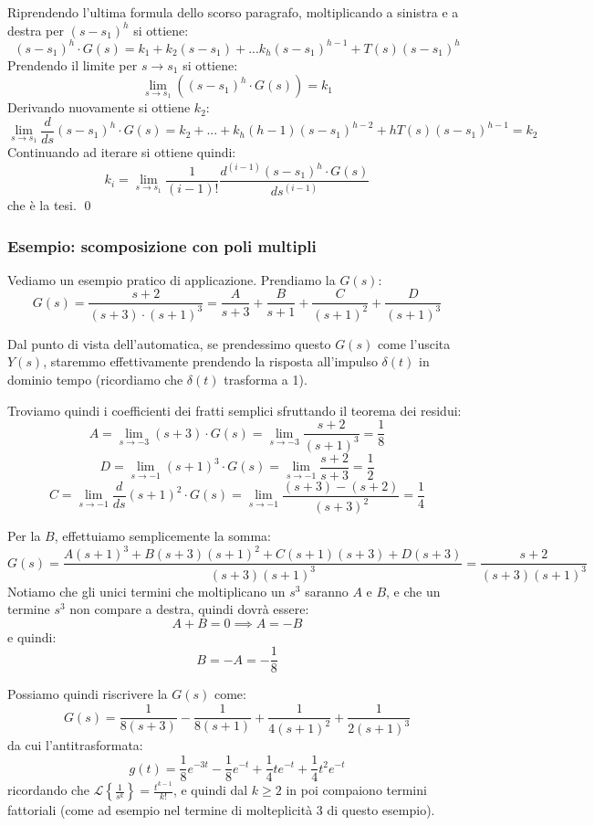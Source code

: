 \documentclass[a4paper,11pt]{article}
\begin{document}
Riprendendo l'ultima formula dello scorso paragrafo, moltiplicando a sinistra e a destra per $(s - s_1)^h$ si ottiene:
$$
(s - s_1)^h \cdot G(s) = k_1 + k_2 (s - s_1) + ... k_h (s - s_1)^{h - 1} + T(s) (s - s_1)^h 
$$
Prendendo il limite per $s \rightarrow s_1$ si ottiene:
$$
\lim_{s \rightarrow s_1} \left( (s - s_1)^h \cdot G(s) \right) = k_1
$$
Derivando nuovamente si ottiene $k_2$:
$$
\lim_{s \rightarrow s_1} \frac{d}{ds} (s - s_1)^h \cdot G(s) = k_2 + ... + k_h (h - 1) (s - s_1)^{h - 2} + h T(s) (s - s_1)^{h - 1} = k_2
$$
Continuando ad iterare si ottiene quindi:
$$
k_i = \lim_{s \rightarrow s_1} \frac{1}{(i - 1)!} \frac{d^{(i - 1)} (s - s_1)^h \cdot G(s) }{ds^{(i - 1)}}
$$
che è la tesi. \qed

\subsubsection{Esempio: scomposizione con poli multipli}
Vediamo un esempio pratico di applicazione.
Prendiamo la $G(s)$:
$$
G(s) = \frac{s + 2}{(s + 3) \cdot (s + 1)^3} = \frac{A}{s + 3} + \frac{B}{s + 1} + \frac{C}{(s + 1)^2} + \frac{D}{(s + 1)^3}
$$

Dal punto di vista dell'automatica, se prendessimo questo $G(s)$ come l'uscita $Y(s)$, staremmo effettivamente prendendo la risposta all'impulso $\delta(t)$ in dominio tempo (ricordiamo che $\delta(t)$ trasforma a 1).

Troviamo quindi i coefficienti dei fratti semplici sfruttando il teorema dei residui:
$$
A = \lim_{s \rightarrow -3} (s + 3) \cdot G(s) = \lim_{s \rightarrow -3} \frac{s + 2}{(s + 1)^3} = \frac{1}{8}
$$
$$
D = \lim_{s \rightarrow -1} (s + 1)^3 \cdot G(s) = \lim_{s \rightarrow -1} \frac{s + 2}{s + 3} = \frac{1}{2} 
$$
$$
C = \lim_{s \rightarrow -1} \frac{d}{ds} (s + 1)^2 \cdot G(s) = \lim_{s \rightarrow -1} \frac{(s + 3) - (s + 2)}{(s + 3)^2} = \frac{1}{4}
$$

Per la $B$, effettuiamo semplicemente la somma:
$$
G(s) = \frac{A(s + 1)^3 + B(s + 3)(s + 1)^2 + C(s + 1)(s + 3) + D(s+3)}{(s + 3)(s + 1)^3} = \frac{s + 2}{(s + 3)(s + 1)^3}
$$
Notiamo che gli unici termini che moltiplicano un $s^3$ saranno $A$ e $B$, e che un termine $s^3$ non compare a destra, quindi dovrà essere:
$$
A + B = 0 \implies A = -B
$$
e quindi:
$$
B = -A = -\frac{1}{8}
$$

Possiamo quindi riscrivere la $G(s)$ come:
$$
G(s) = \frac{1}{8(s + 3)} - \frac{1}{8(s + 1)} + \frac{1}{4(s + 1)^2} + \frac{1}{2(s + 1)^3}
$$
da cui l'antitrasformata:
$$
g(t) = \frac{1}{8}e^{-3t} -\frac{1}{8}e^{-t} + \frac{1}{4} t e^{-t} + \frac{1}{4} t^2 e^{-t}
$$
ricordando che $\mathcal{L}\left\{ \frac{1}{s^k} \right\} = \frac{t^{k - 1}}{k!}$, e quindi dal $k \geq 2$ in poi compaiono termini fattoriali (come ad esempio nel termine di molteplicità 3 di questo esempio).
\end{document}
